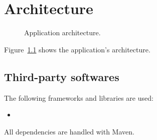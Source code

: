 \chapter{Architecture}\label{ch:arch}

\begin{figure}[p]
	\caption{Application architecture.}
	\label{fig:arch}
\end{figure}

Figure~\ref{fig:arch} shows the application's architecture.

\section{Third-party softwares}\label{sec:thirdparty}

The following frameworks and libraries are used:
\begin{itemize}
	\item \textellipsis
\end{itemize}

All dependencies are handled with Maven.
